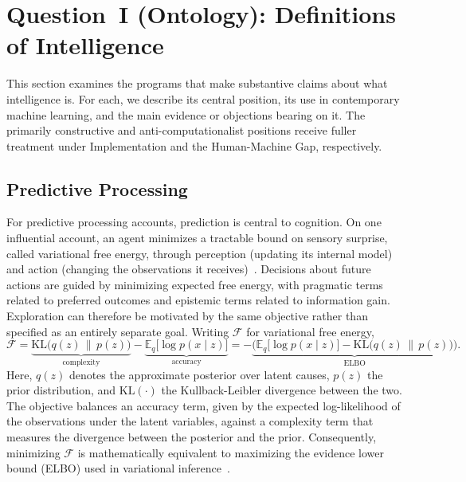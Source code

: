 \documentclass[acmsmall,screen,review,anonymous]{acmart}
\begin{document}








\section{Question~I (Ontology): Definitions of Intelligence}
\label{sec:ontology}
This section examines the programs that make substantive claims about what intelligence is.
%
For each, we describe its central position, its use in contemporary machine learning, and the main evidence or objections bearing on it.
%
The primarily constructive and anti-computationalist positions receive fuller treatment under Implementation and the Human-Machine Gap, respectively.









\subsection{Predictive Processing}
\label{sec:pre-pro}

For predictive processing accounts, prediction is central to cognition.
%
On one influential account, an agent minimizes a tractable bound on sensory surprise, called variational free energy, through perception (updating its internal model) and action (changing the observations it receives)~\citep{friston2010, clark2013}.
%
Decisions about future actions are guided by minimizing expected free energy, with pragmatic terms related to preferred outcomes and epistemic terms related to information gain.
%
Exploration can therefore be motivated by the same objective rather than specified as an entirely separate goal.
%
Writing $\mathcal{F}$ for variational free energy,
\begin{equation}
\label{eq:free-energy}
\mathcal{F}
= \underbrace{\mathrm{KL}\big(q(z) \,\|\, p(z)\big)}_{\text{complexity}}
- \underbrace{\mathbb{E}_{q}\big[\log p(x \mid z)\big]}_{\text{accuracy}}
= -\underbrace{\Big(\mathbb{E}_{q}\big[\log p(x \mid z)\big] - \mathrm{KL}\big(q(z) \,\|\, p(z)\big)\Big)}_{\text{ELBO}}.
\end{equation}
Here, $q(z)$ denotes the approximate posterior over latent causes, $p(z)$ the prior distribution, and $\mathrm{KL}(\cdot)$ the Kullback-Leibler divergence between the two. 
%
The objective balances an accuracy term, given by the expected log-likelihood of the observations under the latent variables, against a complexity term that measures the divergence between the posterior and the prior.
%
Consequently, minimizing $\mathcal{F}$ is mathematically equivalent to maximizing the evidence lower bound (ELBO) used in variational inference~\citep{kingma2022autoencodingvariationalbayes}.
\end{document}
